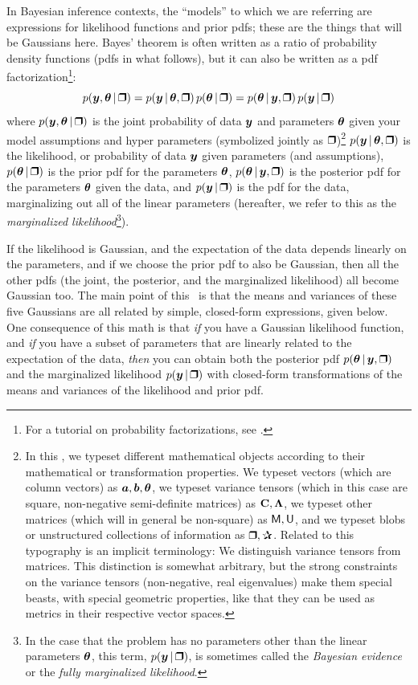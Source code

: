 In Bayesian inference contexts, the ``models'' to which we are referring are
expressions for likelihood functions and prior pdfs; these are the things
that will be Gaussians here.
Bayes' theorem is often written as a ratio of probability density functions
(pdfs in what follows), but it can also be written as a pdf factorization\footnote{For
  a tutorial on probability factorizations, see \cite{probcalc}.}:
\begin{equation}\label{eq:bayes}
p(\vy,\vtheta\given\bH) = p(\vy\given\vtheta,\bH)\,p(\vtheta\given\bH) = p(\vtheta\given\vy,\bH)\,p(\vy\given\bH)
\end{equation}
where
$p(\vy,\vtheta\given\bH)$ is the joint probability of data $\boldsymbol{y}$ and
parameters $\boldsymbol{\theta}$ given your model assumptions and hyper parameters
(symbolized jointly as $\bH$)\footnote{%
  In this \documentname, we typeset different mathematical objects according to their mathematical or transformation properties.
  We typeset vectors (which are column vectors) as $\boldsymbol{a}, \boldsymbol{b}, \boldsymbol{\theta}$,
  we typeset variance tensors (which in this case are square, non-negative semi-definite matrices) as $\mathbf{C}, \mathbf{\Lambda}$,
  we typeset other matrices (which will in general be non-square) as $\mathsf{M}, \mathsf{U}$,
  and we typeset blobs or unstructured
  collections of information as $\bH, \bP$.
  Related to this typography is an implicit terminology:
  We distinguish variance tensors from matrices.
  This distinction is somewhat arbitrary, but the strong constraints on the
  variance tensors (non-negative, real eigenvalues) make them special beasts,
  with special geometric properties, like that they can be used as metrics
  in their respective vector spaces.}
$p(\vy\given\vtheta,\bH)$ is the likelihood, or probability of data $\boldsymbol{y}$
given parameters (and assumptions),
$p(\vtheta\given\bH)$ is the prior pdf for the parameters $\boldsymbol{\theta}$,
$p(\vtheta\given\vy,\bH)$ is the posterior pdf for the parameters $\boldsymbol{\theta}$
given the data,
and
$p(\vy\given\bH)$ is the pdf for the data, marginalizing out all of the linear
parameters (hereafter, we refer to this as the \textsl{marginalized
likelihood}\footnote{In the case that the problem has no parameters other than
the linear parameters $\boldsymbol{\theta}$, this term, $p(\vy \given \bH)$, is sometimes
called the \textsl{Bayesian evidence} or the \textsl{fully marginalized
likelihood}.}).

If the likelihood is Gaussian, and the expectation of the data depends linearly
on the parameters, and if we choose the prior pdf to also be Gaussian, then
all the other pdfs (the joint, the posterior, and the marginalized likelihood)
all become Gaussian too.
The main point of this \documentname\ is that the means and variances of these
five Gaussians are all related by simple, closed-form expressions, given below.
One consequence of this math is that \emph{if} you have a Gaussian
likelihood function, and \emph{if} you have a subset of parameters that are
linearly related to the expectation of the data, \emph{then} you can obtain both
the posterior pdf $p(\vtheta\given\vy,\bH)$ and the marginalized likelihood
$p(\vy\given\bH)$ with closed-form transformations of the means and variances of
the likelihood and prior pdf.

